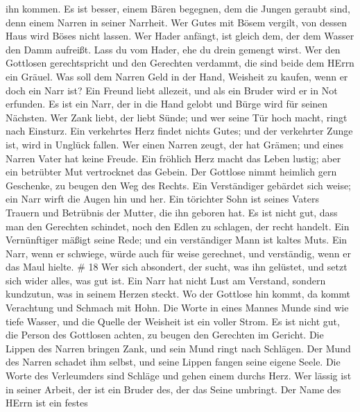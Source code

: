 ihn kommen.  Es ist besser, einem Bären begegnen, dem die
Jungen geraubt sind, denn einem Narren in seiner Narrheit. 
Wer Gutes mit Bösem vergilt, von dessen Haus wird Böses nicht lassen.
 Wer Hader anfängt, ist gleich dem, der dem Wasser den Damm
aufreißt. Lass du vom Hader, ehe du drein gemengt wirst. 
Wer den Gottlosen gerechtspricht und den Gerechten verdammt, die sind
beide dem HErrn ein Gräuel.  Was soll dem Narren Geld in
der Hand, Weisheit zu kaufen, wenn er doch ein Narr ist? 
Ein Freund liebt allezeit, und als ein Bruder wird er in Not erfunden.
 Es ist ein Narr, der in die Hand gelobt und Bürge wird für
seinen Nächsten.  Wer Zank liebt, der liebt Sünde; und wer
seine Tür hoch macht, ringt nach Einsturz.  Ein verkehrtes
Herz findet nichts Gutes; und der verkehrter Zunge ist, wird in Unglück
fallen.  Wer einen Narren zeugt, der hat Grämen; und eines
Narren Vater hat keine Freude.  Ein fröhlich Herz macht das
Leben lustig; aber ein betrübter Mut vertrocknet das Gebein.
 Der Gottlose nimmt heimlich gern Geschenke, zu beugen den
Weg des Rechts.  Ein Verständiger gebärdet sich weise; ein
Narr wirft die Augen hin und her.  Ein törichter Sohn ist
seines Vaters Trauern und Betrübnis der Mutter, die ihn geboren hat.
 Es ist nicht gut, dass man den Gerechten schindet, noch
den Edlen zu schlagen, der recht handelt.  Ein Vernünftiger
mäßigt seine Rede; und ein verständiger Mann ist kaltes Muts.
 Ein Narr, wenn er schwiege, würde auch für weise
gerechnet, und verständig, wenn er das Maul hielte. \# 18 
Wer sich absondert, der sucht, was ihn gelüstet, und setzt sich wider
alles, was gut ist.  Ein Narr hat nicht Lust am Verstand,
sondern kundzutun, was in seinem Herzen steckt.  Wo der
Gottlose hin kommt, da kommt Verachtung und Schmach mit Hohn.
 Die Worte in eines Mannes Munde sind wie tiefe Wasser, und
die Quelle der Weisheit ist ein voller Strom.  Es ist nicht
gut, die Person des Gottlosen achten, zu beugen den Gerechten im
Gericht.  Die Lippen des Narren bringen Zank, und sein Mund
ringt nach Schlägen.  Der Mund des Narren schadet ihm
selbst, und seine Lippen fangen seine eigene Seele.  Die
Worte des Verleumders sind Schläge und gehen einem durchs Herz.
 Wer lässig ist in seiner Arbeit, der ist ein Bruder des,
der das Seine umbringt.  Der Name des HErrn ist ein festes
